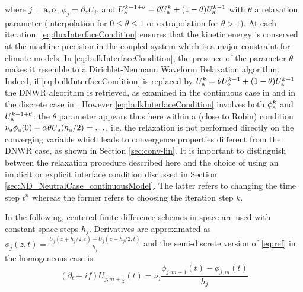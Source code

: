 %
where $j={\rm a},{\rm o}$, $\phi_j = \partial_z U_j$, and 
$U_{\rm a}^{k-1+\theta} = \theta U_{\rm a}^{k} + (1-\theta) U_{\rm a}^{k-1}$
with $\theta$ a relaxation parameter (interpolation for $0\leq \theta \leq 1$ or extrapolation for $\theta>1$). 
%
%
At each iteration, \eqref{eq:fluxInterfaceCondition} ensures that the 
kinetic energy is conserved at the machine precision in the coupled 
system which is a major constraint for climate models. 
In \eqref{eq:bulkInterfaceCondition},
the presence of the parameter $\theta$ makes it resemble to a Dirichlet-Neumann Waveform Relaxation algorithm.
Indeed, if \eqref{eq:bulkInterfaceCondition} is replaced
by $U_{\rm a}^k = \theta U_{\rm o}^{k-1} + (1-\theta) U_{\rm a}^{k-1}$ the DNWR algorithm is retrieved, as examined in the continuous case in \cite{gander_dirichlet-neumann_2014} and in the discrete case in
\cite{meisrimel_time_2020}.
However \eqref{eq:bulkInterfaceCondition}
involves both $\phi_{\rm a}^k$ and 
$U_{\rm a}^{k-1+\theta}$:
the $\theta$ parameter appears thus here within a (close to Robin) condition  
$\nu_{\rm a} \phi_{\rm a}(0) - \alpha \theta U_{\rm a}(h_{\rm a}/2) = \ldots$,
i.e. the relaxation is not performed directly on the converging variable
which leads to convergence properties different from the DNWR case, 
as shown in Section \ref{sec:conv-lin}.
It is important to distinguish between the relaxation
procedure described here and the choice of using an implicit or
explicit interface condition discussed in Section
\ref{sec:ND_NeutralCase_continuousModel}.
The latter refers to changing the time step $t^n$ whereas the former
refers to choosing the iteration step $k$.
\par
%
In the following, centered finite difference schemes in space are used with constant space steps $h_j$.
Derivatives are approximated as $\phi_j(z,t) = \frac{U_j(z+h_j/2,t) - U_j(z-h_j/2, t)}{h_j}$
and the semi-discrete version of \eqref{eq:ref} in the homogeneous case is
\begin{equation}\label{eq:spaceTimeScheme}
	(\partial_t + if) U_{j, m+\frac{1}{2}} (t) = \nu_j \frac{\phi_{j,m+1}(t) - \phi_{j,m}(t)}{h_j}
\end{equation}

